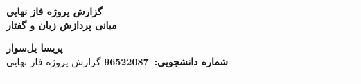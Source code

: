 \def \Subject {گزارش پروژه فاز نهایی}
\def \Course {مبانی پردازش زبان و گفتار}
\def \Author {پریسا یل‌سوار}
\def \Report {گزارش پروژه فاز نهایی}
\def \StudentNumber {96522087}

\begin{center}
	\vspace{.4cm}
	{\bf {\huge \Subject}}\\
	{\bf \Large \Course}
	\vspace{.2cm}
\end{center}
{\bf \Author }  \\
{\bf شماره دانشجویی:\ \StudentNumber}
\hspace{\fill} 
{\Large \Report} \\
\hrule
\vspace{0.8cm}

\clearpage


\tableofcontents
\newpage
\listoffigures
\newpage

	
	\newpage
	
	\newpage
	
	\newpage
	
	
	\newpage
	








